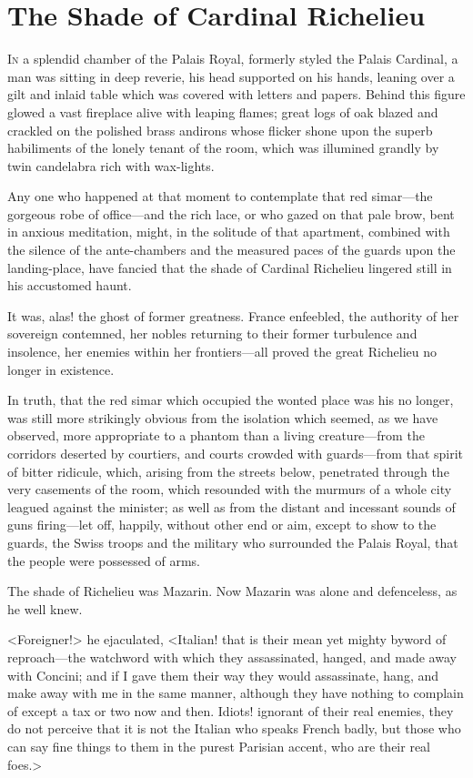 \chapter{The Shade of Cardinal Richelieu}

 \lettrine{I}{n} a splendid chamber of the Palais Royal, formerly styled the Palais Cardinal, a man was sitting in deep reverie, his head supported on his hands, leaning over a gilt and inlaid table which was covered with letters and papers. Behind this figure glowed a vast fireplace alive with leaping flames; great logs of oak blazed and crackled on the polished brass andirons whose flicker shone upon the superb habiliments of the lonely tenant of the room, which was illumined grandly by twin candelabra rich with wax-lights.

Any one who happened at that moment to contemplate that red simar—the gorgeous robe of office—and the rich lace, or who gazed on that pale brow, bent in anxious meditation, might, in the solitude of that apartment, combined with the silence of the ante-chambers and the measured paces of the guards upon the landing-place, have fancied that the shade of Cardinal Richelieu lingered still in his accustomed haunt.

It was, alas! the ghost of former greatness. France enfeebled, the authority of her sovereign contemned, her nobles returning to their former turbulence and insolence, her enemies within her frontiers—all proved the great Richelieu no longer in existence.

In truth, that the red simar which occupied the wonted place was his no longer, was still more strikingly obvious from the isolation which seemed, as we have observed, more appropriate to a phantom than a living creature—from the corridors deserted by courtiers, and courts crowded with guards—from that spirit of bitter ridicule, which, arising from the streets below, penetrated through the very casements of the room, which resounded with the murmurs of a whole city leagued against the minister; as well as from the distant and incessant sounds of guns firing—let off, happily, without other end or aim, except to show to the guards, the Swiss troops and the military who surrounded the Palais Royal, that the people were possessed of arms.

The shade of Richelieu was Mazarin. Now Mazarin was alone and defenceless, as he well knew.

<Foreigner!> he ejaculated, <Italian! that is their mean yet mighty byword of reproach—the watchword with which they assassinated, hanged, and made away with Concini; and if I gave them their way they would assassinate, hang, and make away with me in the same manner, although they have nothing to complain of except a tax or two now and then. Idiots! ignorant of their real enemies, they do not perceive that it is not the Italian who speaks French badly, but those who can say fine things to them in the purest Parisian accent, who are their real foes.>

